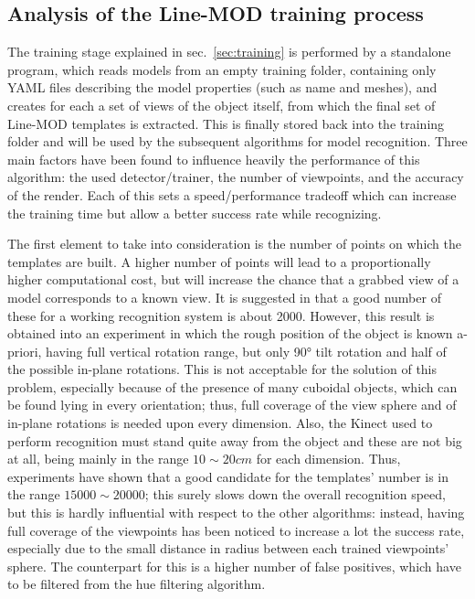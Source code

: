 \subsection{Analysis of the Line-MOD training process}
The training stage explained in sec.~\ref{sec:training} is performed
by a standalone program, which reads models from an empty training
folder, containing only YAML files describing the model properties
(such as name and meshes), and creates for each a set of views of the
object itself, from which the final set of Line-MOD templates is
extracted. This is finally stored back into the training folder and
will be used by the subsequent algorithms for model recognition.
Three main factors have been found to influence heavily the performance of this algorithm: the used
detector/trainer, the number of viewpoints, and the accuracy of the
render. Each of this sets a speed/performance tradeoff which can
increase the training time but allow a better success rate while
recognizing.

The first element to take into consideration is the number of points
on which the templates are built. A higher number of points will lead
to a proportionally higher computational cost, but will increase the
chance that a grabbed view of a model corresponds to a known view. It
is suggested in \cite{linemod-paper} that a good number of these
for a working recognition system is about 2000. However, this result
is obtained into an experiment in which the rough position of the
object is known a-priori, having full vertical rotation range, but
only 90° tilt rotation and half of the possible in-plane
rotations. This is not acceptable for the solution of this problem,
especially because of the presence of many cuboidal objects, which can
be found lying in every orientation; thus, full coverage of the view
sphere and of in-plane rotations is needed upon every dimension. Also, the Kinect used to perform recognition must
stand quite away from the object and these are not big at all, being
mainly in the range $10\sim 20\unit{cm}$ for each dimension. Thus, experiments have shown
that a good candidate for the templates' number is in the range
$15000\sim 20000$; this surely slows down the overall recognition speed,
but this is hardly influential with respect to the other algorithms:
instead, having full coverage of the viewpoints has been noticed to
increase a lot the success rate, especially due to the small distance
in radius between each trained viewpoints' sphere. The counterpart for
this is a higher number of false positives, which have to be filtered
from the hue filtering algorithm.

